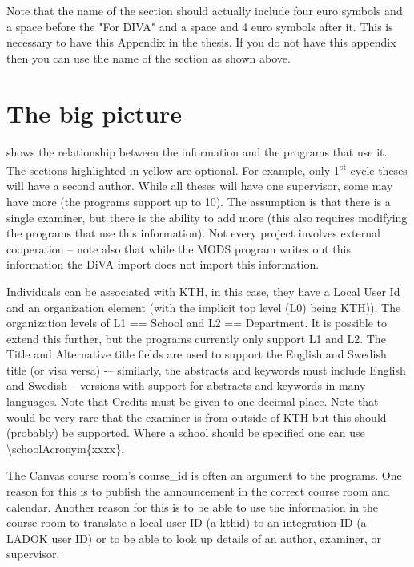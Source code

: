 Note that the name of the section should actually include four euro symbols and a space before the "For DIVA" and a space and 4 euro symbols after it. This is necessary to have this Appendix in the thesis. If you do not have this appendix then you can use the name of the section as shown above.
\clearpage

\section{The big picture}

 shows the relationship between the information and the programs that use it. The sections highlighted in yellow are optional. For example, only 1\textsuperscript{st} cycle theses will have a second author. While all theses will have one supervisor, some may have more (the programs support up to 10). The assumption is that there is a single examiner, but there is the ability to add more (this also requires modifying the programs that use this information). Not every project involves external cooperation – note also that while the MODS program writes out this information the DiVA import does not import this information.

Individuals can be associated with KTH, in this case, they have a Local User Id and an organization element (with the implicit top level (L0) being KTH)). The organization levels of L1 == School and L2 == Department. It is possible to extend this further, but the programs currently only support L1 and L2. The Title and Alternative title fields are used to support the English and Swedish title (or visa versa) -– similarly, the abstracts and keywords must include English and Swedish – versions with support for abstracts and keywords in many languages. Note that Credits must be given to one decimal place.
Note that would be very rare that the examiner is from outside of KTH but this should (probably) be supported. Where a school should be specified one can use \textbackslash schoolAcronym\{xxxx\}.

The Canvas course room’s course\_id is often an argument to the programs. One reason for this is to publish the announcement in the correct course room and calendar. Another reason for this is to be able to use the information in the course room to translate a local user ID (\ie a kthid) to an integration ID (\ie a LADOK user ID) or to be able to look up details of an author, examiner, or supervisor.




